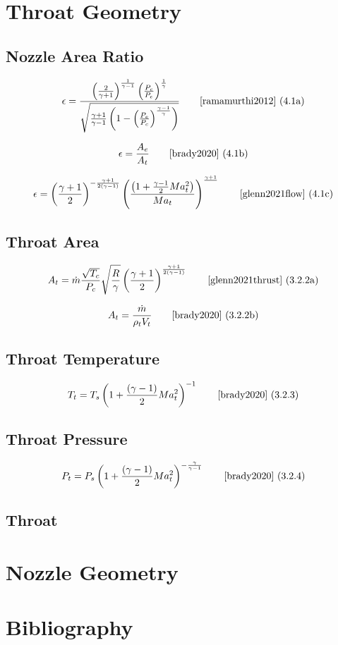 \documentclass{article}
\newcommand{\eqcite}[3]{\begin{equation}#1\tag*{\text{\cite{#3}~(#2)}}\end{equation}}
\begin{document}
\section{Throat Geometry}

\subsection[Nozzle Area Ratio]{Nozzle Area Ratio}

\eqcite{\epsilon = \frac{\left(\frac{2}{\gamma+1}\right)^\frac{1}{\gamma-1}\left(\frac{P_c}{P_e}\right)^\frac{1}{\gamma}}{\sqrt{\frac{\gamma+1}{\gamma-1}\left(1-\left(\frac{P_e}{P_c}\right)^\frac{\gamma-1}{\gamma}\right)}}}{4.1a}{ramamurthi2012}

\eqcite{\epsilon = \frac{A_e}{A_t}}{4.1b}{brady2020}

\eqcite{\epsilon = \left(\frac{\gamma+1}{2}\right)^{-\frac{\gamma+1}{2\left(\gamma-1\right)}}\left(\frac{\left(1+\frac{\gamma-1}{2}Ma_t^2\right)}{Ma_t}\right)^{\frac{\gamma+1}{}}}{4.1c}{glenn2021flow}

\subsection[Throat Area]{Throat Area}

\eqcite{A_t = \dot{m} \frac{\sqrt{T_c}}{P_c} \sqrt{\frac{R}{\gamma}} \left(\frac{\gamma+1}{2}\right)^\frac{\gamma+1}{2\left(\gamma-1\right)}}{3.2.2a}{glenn2021thrust}

\eqcite{A_t = \frac{\dot{m}}{\rho_t V_t}}{3.2.2b}{brady2020}

\subsection{Throat Temperature}

\eqcite{T_t = T_s \left( 1 + \frac{\left(\gamma-1\right)}{2} Ma_t^2\right)^{-1}}{3.2.3}{brady2020}

\subsection{Throat Pressure}

\eqcite{P_t = P_s \left( 1 + \frac{\left(\gamma-1\right)}{2}Ma_t^2\right)^{-\frac{\gamma}{\gamma-1}}}{3.2.4}{brady2020}

\subsection{Throat }

\section{Nozzle Geometry}



\pagebreak
\section*{Bibliography}


\end{document}
